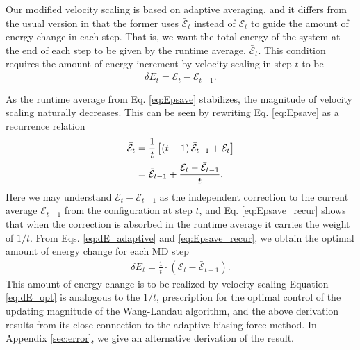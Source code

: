 \documentclass[reprint]{revtex4-1}
\begin{document}
Our modified velocity scaling is based on adaptive averaging,
and it differs from the usual version
in that the former uses $\bar{\mathcal E}_t$
instead of $\mathcal E_t$
to guide the amount of energy change in each step.
%
That is, we want
the total energy of the system
at the end of each step
to be given by
the runtime average, $\bar{\mathcal E}_t$.
%
This condition requires the amount of energy increment
by velocity scaling in step $t$ to be
%
\begin{equation}
  \delta E_t
  =
  \bar{\mathcal E}_t - \bar{\mathcal E}_{t - 1}
  .
  \label{eq:dE_adaptive}
\end{equation}

As the runtime average from Eq. \eqref{eq:Epsave}
stabilizes, the magnitude of velocity scaling
naturally decreases.
%
This can be seen by rewriting Eq. \eqref{eq:Epsave}
as a recurrence relation
%
\begin{align}
  \bar{\mathcal E}_t
  &=
  \frac{1}{t}
  \left[
    (t - 1) \, \bar{\mathcal E}_{t - 1}
    + \mathcal E_t
  \right]
  \notag \\
  &=
  \bar{\mathcal E}_{t - 1}
  +
  \frac{
    \mathcal E_t - \bar{\mathcal E}_{t - 1}
  }
  {
    t
  }
  .
\label{eq:Epsave_recur}
\end{align}
%
Here we may understand $\mathcal E_t - \bar{\mathcal E}_{t - 1}$
as the independent correction
to the current average $\bar{\mathcal E}_{t - 1}$
from the configuration at step $t$,
and Eq. \eqref{eq:Epsave_recur} shows that
when the correction is absorbed in the runtime average
it carries the weight of $1/t$.
%
From Eqs. \eqref{eq:dE_adaptive} and \eqref{eq:Epsave_recur},
we obtain the optimal amount of energy change
for each MD step
\begin{align}
  \delta E_t
  =
  \frac{ 1 } { t }
  \cdot
  \left( \mathcal E_t - \bar{\mathcal E}_{t - 1} \right)
  .
  \label{eq:dE_opt}
\end{align}
%
This amount of energy change is to be realized by velocity scaling
%
Equation \eqref{eq:dE_opt} is analogous to the $1/t$, prescription\cite{
  belardinelli2007, belardinelli2007jcp, belardinelli2008,
  zhou2005, zhou2008, morozov2007}
for the optimal control of the updating magnitude
of the Wang-Landau algorithm\cite{wang2001, wang2001pre},
and the above derivation results from its close connection\cite{
  marsili2006, barducci2008}
to the adaptive biasing force method\cite{darve2001, darve2008}.
%
In Appendix \ref{sec:error}, we give an alternative derivation of the result.
\end{document}
